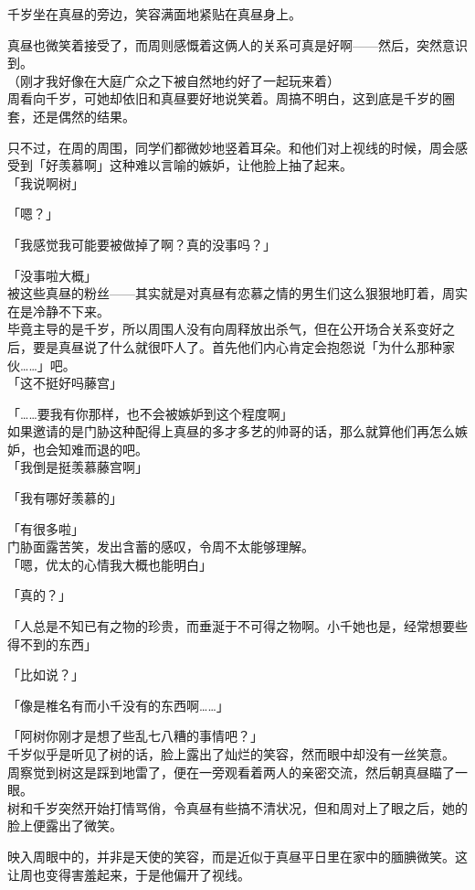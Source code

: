 千岁坐在真昼的旁边，笑容满面地紧贴在真昼身上。

真昼也微笑着接受了，而周则感慨着这俩人的关系可真是好啊——然后，突然意识到。\\

（刚才我好像在大庭广众之下被自然地约好了一起玩来着）\\

周看向千岁，可她却依旧和真昼要好地说笑着。周搞不明白，这到底是千岁的圈套，还是偶然的结果。

只不过，在周的周围，同学们都微妙地竖着耳朵。和他们对上视线的时候，周会感受到「好羡慕啊」这种难以言喻的嫉妒，让他脸上抽了起来。\\

「我说啊树」

「嗯？」

「我感觉我可能要被做掉了啊？真的没事吗？」

「没事啦大概」\\

被这些真昼的粉丝——其实就是对真昼有恋慕之情的男生们这么狠狠地盯着，周实在是冷静不下来。\\

毕竟主导的是千岁，所以周围人没有向周释放出杀气，但在公开场合关系变好之后，要是真昼说了什么就很吓人了。首先他们内心肯定会抱怨说「为什么那种家伙……」吧。\\

「这不挺好吗藤宫」

「……要我有你那样，也不会被嫉妒到这个程度啊」\\

如果邀请的是门胁这种配得上真昼的多才多艺的帅哥的话，那么就算他们再怎么嫉妒，也会知难而退的吧。\\

「我倒是挺羡慕藤宫啊」

「我有哪好羡慕的」

「有很多啦」\\

门胁面露苦笑，发出含蓄的感叹，令周不太能够理解。\\

「嗯，优太的心情我大概也能明白」

「真的？」

「人总是不知已有之物的珍贵，而垂涎于不可得之物啊。小千她也是，经常想要些得不到的东西」

「比如说？」

「像是椎名有而小千没有的东西啊……」

「阿树你刚才是想了些乱七八糟的事情吧？」\\

千岁似乎是听见了树的话，脸上露出了灿烂的笑容，然而眼中却没有一丝笑意。\\

周察觉到树这是踩到地雷了，便在一旁观看着两人的亲密交流，然后朝真昼瞄了一眼。\\

树和千岁突然开始打情骂俏，令真昼有些搞不清状况，但和周对上了眼之后，她的脸上便露出了微笑。

映入周眼中的，并非是天使的笑容，而是近似于真昼平日里在家中的腼腆微笑。这让周也变得害羞起来，于是他偏开了视线。
